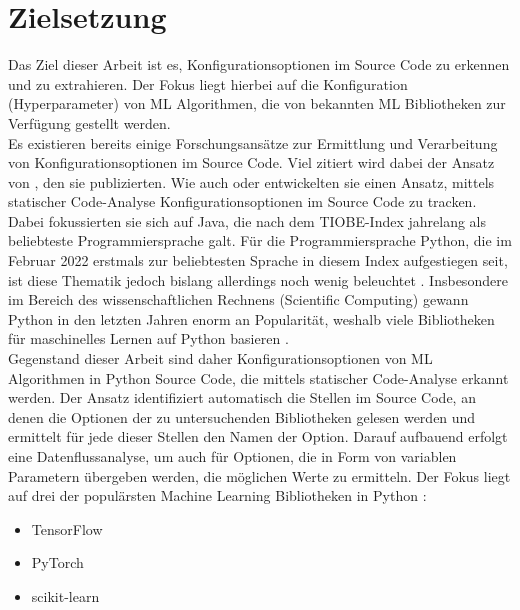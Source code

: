\documentclass[german,bachelor]{swsLeipzig}
\begin{document}
\section{Zielsetzung}
Das Ziel dieser Arbeit ist es, Konfigurationsoptionen im Source Code zu erkennen und zu extrahieren.
Der Fokus liegt hierbei auf die Konfiguration (Hyperparameter) von ML Algorithmen, die von bekannten ML Bibliotheken
zur Verfügung gestellt werden.\\
\indent Es existieren bereits einige Forschungsansätze zur Ermittlung und Verarbeitung von Konfigurationsoptionen im Source Code.
Viel zitiert wird dabei der Ansatz von \citeauthor{10.1145/1985793.1985812}, den sie \citeyear{10.1145/1985793.1985812} publizierten.
Wie auch \citeauthor{7774519} oder \citeauthor{8049300} entwickelten sie einen Ansatz, mittels statischer Code-Analyse Konfigurationsoptionen
im Source Code zu tracken.
Dabei fokussierten sie sich auf Java, die nach dem TIOBE-Index jahrelang als beliebteste Programmiersprache galt.
Für die Programmiersprache Python, die im Februar 2022 erstmals zur beliebtesten Sprache in diesem Index aufgestiegen seit,
ist diese Thematik jedoch bislang allerdings noch wenig beleuchtet \cite[]{enwiki:1077809155}.
Insbesondere im Bereich des wissenschaftlichen Rechnens (Scientific Computing) gewann Python in den letzten Jahren enorm an Popularität,
weshalb viele Bibliotheken für maschinelles Lernen auf Python basieren \cite[]{2020}.\\
\indent Gegenstand dieser Arbeit sind daher Konfigurationsoptionen von ML Algorithmen in Python Source Code, die mittels statischer Code-Analyse erkannt werden.
Der Ansatz identifiziert automatisch die Stellen im Source Code, an denen die Optionen der zu untersuchenden Bibliotheken gelesen werden
und ermittelt für jede dieser Stellen den Namen der Option.
Darauf aufbauend erfolgt eine Datenflussanalyse, um auch für Optionen, die in Form von variablen Parametern übergeben werden,
die möglichen Werte zu ermitteln.
Der Fokus liegt auf drei der populärsten Machine Learning Bibliotheken in Python \cite[]{kaggle}:
\begin{itemize}
 \item TensorFlow
 \item PyTorch
 \item scikit-learn
\end{itemize}
\
\end{document}

